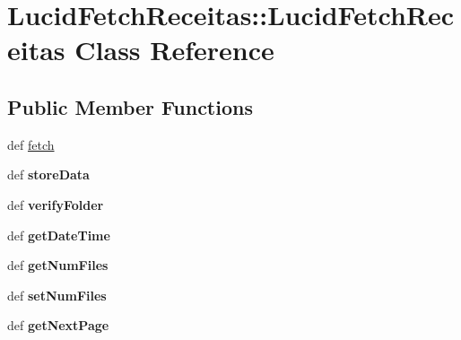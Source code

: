 \hypertarget{classLucidFetchReceitas_1_1LucidFetchReceitas}{
\section{LucidFetchReceitas::LucidFetchReceitas Class Reference}
\label{classLucidFetchReceitas_1_1LucidFetchReceitas}
}
\subsection*{Public Member Functions}
\begin{DoxyCompactItemize}
\item 
def \hyperlink{classLucidFetchReceitas_1_1LucidFetchReceitas_ae9a10ef27856a0ef1e898a5820874f8e}{fetch}
\item 
\hypertarget{classLucidFetchReceitas_1_1LucidFetchReceitas_acdc9d9d71744ef3660b7b5b9052372d3}{
def {\bfseries storeData}}
\label{classLucidFetchReceitas_1_1LucidFetchReceitas_acdc9d9d71744ef3660b7b5b9052372d3}

\item 
\hypertarget{classLucidFetchReceitas_1_1LucidFetchReceitas_a404c9595bca7b361c4e12bf5c2478c55}{
def {\bfseries verifyFolder}}
\label{classLucidFetchReceitas_1_1LucidFetchReceitas_a404c9595bca7b361c4e12bf5c2478c55}

\item 
\hypertarget{classLucidFetchReceitas_1_1LucidFetchReceitas_a382591947af9088eb20a3a29aa931a78}{
def {\bfseries getDateTime}}
\label{classLucidFetchReceitas_1_1LucidFetchReceitas_a382591947af9088eb20a3a29aa931a78}

\item 
\hypertarget{classLucidFetchReceitas_1_1LucidFetchReceitas_a0f409f06b0ca4d43b05ccd1096055716}{
def {\bfseries getNumFiles}}
\label{classLucidFetchReceitas_1_1LucidFetchReceitas_a0f409f06b0ca4d43b05ccd1096055716}

\item 
\hypertarget{classLucidFetchReceitas_1_1LucidFetchReceitas_a219d0b961b45b996e6237af8bfb389e2}{
def {\bfseries setNumFiles}}
\label{classLucidFetchReceitas_1_1LucidFetchReceitas_a219d0b961b45b996e6237af8bfb389e2}

\item 
\hypertarget{classLucidFetchReceitas_1_1LucidFetchReceitas_a54f88f046c6683872704b763e80ebc61}{
def {\bfseries getNextPage}}
\label{classLucidFetchReceitas_1_1LucidFetchReceitas_a54f88f046c6683872704b763e80ebc61}

\end{DoxyCompactItemize}

